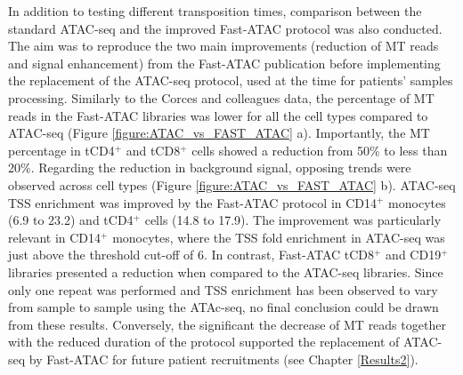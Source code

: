 In addition to testing different transposition times, comparison between the standard ATAC-seq and the improved Fast-ATAC protocol \parencite{Corces2016} was also conducted. The aim was to reproduce the two main improvements (reduction of MT reads and signal enhancement) from the Fast-ATAC publication before implementing the replacement of the ATAC-seq protocol, used at the time for patients' samples processing. Similarly to the Corces and colleagues data, the percentage of MT reads in the Fast-ATAC libraries was lower for all the cell types compared to ATAC-seq (Figure \ref{figure:ATAC_vs_FAST_ATAC} a). Importantly, the MT percentage in tCD4$^+$ and tCD8$^+$ cells showed a reduction from 50\% to less than 20\%. Regarding the reduction in background signal, opposing trends were observed across cell types (Figure \ref{figure:ATAC_vs_FAST_ATAC} b). ATAC-seq TSS enrichment was improved by the Fast-ATAC protocol in CD14$^+$ monocytes (6.9 to 23.2) and tCD4$^+$ cells (14.8 to 17.9). The improvement was particularly relevant in CD14$^+$ monocytes, where the TSS fold enrichment in ATAC-seq was just above the threshold cut-off of 6. In contrast, Fast-ATAC tCD8$^+$ and CD19$^+$ libraries presented a reduction when compared to the ATAC-seq libraries. Since only one repeat was performed and TSS enrichment has been observed to vary from sample to sample using the ATAc-seq, no final conclusion could be drawn from these results. Conversely, the significant the decrease of MT reads together with the reduced duration of the protocol supported the replacement of ATAC-seq by Fast-ATAC for future patient recruitments (see Chapter \ref{Results2}). 



